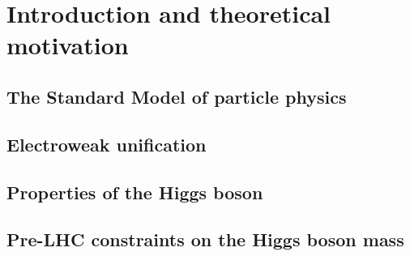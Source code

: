 
\chapter{Introduction and theoretical motivation}
\label{chap:motivation}

\section{The Standard Model of particle physics}
	\label{sec:sm}
	
\section{Electroweak unification}
	\label{sec:ewsb}
	
\section{Properties of the Higgs boson}
	\label{sec:properties}
	
\section{Pre-LHC constraints on the Higgs boson mass}
	\label{sec:prior_constraints}
	



